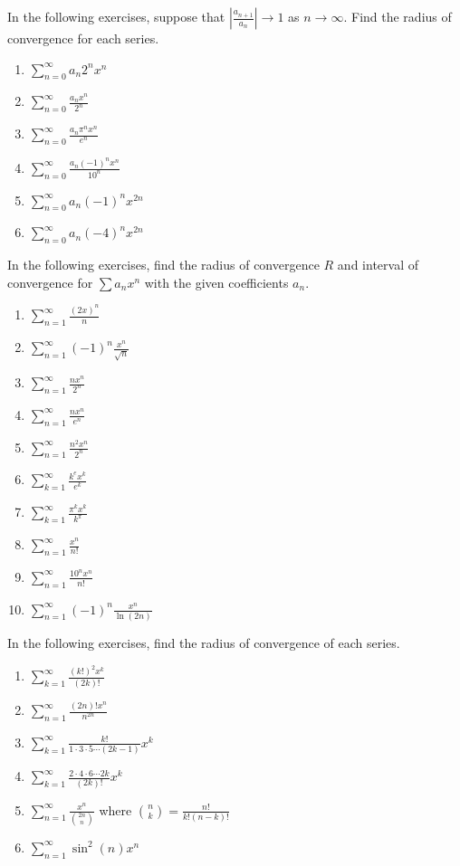 \documentclass{exercises}
\begin{document}
In the following exercises, suppose that $|\frac{a_{n+1}}{a_{n}}|\to1$ as $n\to \infty$. Find the radius of convergence for each series.

\begin{enumerate}[resume]
\item $\sum_{n=0}^{\infty}a_{n}2^{n}x^{n}$
\item $\sum_{n=0}^{\infty}\frac{a_{n}x^{n}}{2^{n}}$
\item $\sum_{n=0}^{\infty}\frac{a_{n}\pi^{n}x^{n}}{e^{n}}$
\item $\sum_{n=0}^{\infty}\frac{a_{n}{(-1)}^{n}x^{n}}{10^{n}}$
\item $\sum_{n=0}^{\infty}a_{n}{(-1)}^{n}x^{2n}$
\item $\sum_{n=0}^{\infty}a_{n}{(-4)}^{n}x^{2n}$
\end{enumerate}

In the following exercises, find the radius of convergence $R$ and interval of convergence for $\sum a_{n}x^{n}$ with the given coefficients $a_{n}$.

\begin{enumerate}[resume]
\item $\sum_{n=1}^{\infty}\frac{{(2x)}^{n}}{n}$
\item $\sum_{n=1}^{\infty}{(-1)}^{n}\frac{x^{n}}{\sqrt{n}}$
\item $\sum_{n=1}^{\infty}\frac{nx^{n}}{2^{n}}$
\item $\sum_{n=1}^{\infty}\frac{nx^{n}}{e^{n}}$
\item $\sum_{n=1}^{\infty}\frac{n^{2}x^{n}}{2^{n}}$
\item $\sum_{k=1}^{\infty}\frac{k^{e}x^{k}}{e^{k}}$
\item $\sum_{k=1}^{\infty}\frac{\pi^{k}x^{k}}{k^{\pi}}$
\item $\sum_{n=1}^{\infty}\frac{x^{n}}{n!}$
\item $\sum_{n=1}^{\infty}\frac{10^{n}x^{n}}{n!}$
\item $\sum_{n=1}^{\infty}{(-1)}^{n}\frac{x^{n}}{\ln (2n)}$
\end{enumerate}

In the following exercises, find the radius of convergence of each series.

\begin{enumerate}[resume]
\item $\sum_{k=1}^{\infty}\frac{{(k!)}^{2}x^{k}}{(2k)!}$
\item $\sum_{n=1}^{\infty}\frac{(2n)!x^{n}}{n^{2n}}$
\item $\sum_{k=1}^{\infty}\frac{k!}{1\cdot3\cdot5\cdots(2k-1)}x^{k}$
\item $\sum_{k=1}^{\infty}\frac{2\cdot4\cdot6\cdots2k}{(2k)!}x^{k}$
\item $\sum_{n=1}^{\infty}\frac{x^{n}}{\binom{2n}{n}}$ where $\binom{n}{k}=\frac{n!}{k!(n-k)!}$
\item $\sum_{n=1}^{\infty}\sin^{2}(n)x^{n}$
\end{enumerate}
\end{document}
